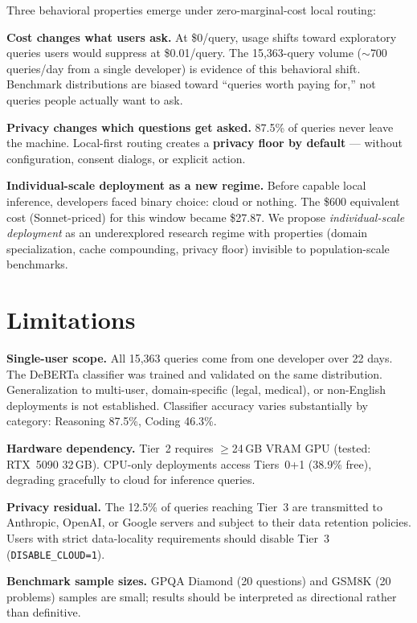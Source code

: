 \documentclass[11pt]{article}
\begin{document}
Three behavioral properties emerge under zero-marginal-cost local
routing:

\textbf{Cost changes what users ask.} At \$0/query, usage shifts toward
exploratory queries users would suppress at \$0.01/query. The
15,363-query volume ($\sim$700 queries/day from a single developer) is
evidence of this behavioral shift. Benchmark distributions are biased
toward ``queries worth paying for,'' not queries people actually want to
ask.

\textbf{Privacy changes which questions get asked.} 87.5\% of queries
never leave the machine. Local-first routing creates a \textbf{privacy
floor by default} --- without configuration, consent dialogs, or explicit
action.

\textbf{Individual-scale deployment as a new regime.} Before capable
local inference, developers faced binary choice: cloud or nothing. The
\$600 equivalent cost (Sonnet-priced) for this window became \$27.87.
We propose \textit{individual-scale deployment} as an underexplored
research regime with properties (domain specialization, cache
compounding, privacy floor) invisible to population-scale benchmarks.

\section*{Limitations}
\label{sec:limitations}

\textbf{Single-user scope.} All 15,363 queries come from one developer
over 22 days. The DeBERTa classifier was trained and validated on the
same distribution. Generalization to multi-user, domain-specific
(legal, medical), or non-English deployments is not established.
Classifier accuracy varies substantially by category: Reasoning 87.5\%,
Coding 46.3\%.

\textbf{Hardware dependency.} Tier~2 requires $\geq$24\,GB VRAM GPU
(tested: RTX~5090 32\,GB). CPU-only deployments access Tiers~0+1
(38.9\% free), degrading gracefully to cloud for inference queries.

\textbf{Privacy residual.} The 12.5\% of queries reaching Tier~3 are
transmitted to Anthropic, OpenAI, or Google servers and subject to
their data retention policies. Users with strict data-locality
requirements should disable Tier~3 (\texttt{DISABLE\_CLOUD=1}).

\textbf{Benchmark sample sizes.} GPQA Diamond (20 questions) and GSM8K
(20 problems) samples are small; results should be interpreted as
directional rather than definitive.
\end{document}
